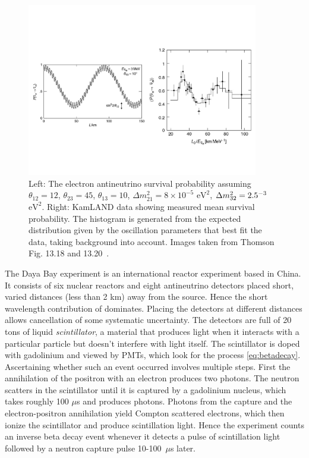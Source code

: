\begin{figure}
  \centering
  \vspace{-20mm}
  \includegraphics[width=0.9\textwidth,keepaspectratio]
                {pictures/t13_18&20.pdf}
  \vspace*{-15mm}
  \caption{Left: The electron antineutrino survival probability assuming
           $\theta_{12}=12$\textdegree, $\theta_{23}=45$\textdegree,
           $\theta_{13}=10$\textdegree, $\Delta m_{21}^2=8\times10^{-5}$
           $\text{eV}^2$, $\Delta m_{32}^2=2.5\time10^{-3}$ $\text{eV}^2$.
           Right: KamLAND data showing measured mean survival probability.
           The histogram is generated from the expected distribution given
           by the oscillation parameters that best fit the data, taking
           background into account. Images taken from Thomson Fig.
           13.18 and 13.20~\cite{thomson_modern_2013}.}
  \label{fig:kamland}
\end{figure}

The Daya Bay experiment is an international reactor experiment based in China.
It consists of
six nuclear reactors and eight antineutrino detectors placed short, varied
distances (less than 2 km) away from the source. Hence the short
wavelength contribution of  dominates. Placing the
detectors at different distances allows cancellation of some systematic
uncertainty. The detectors are full of 20 tons of
liquid {\it scintillator}, a material that produces light when it interacts
with a particular particle but doesn't interfere with light itself.
The scintillator is doped with gadolinium and viewed by PMTs, which look for
the process \eqref{eq:betadecay}. Ascertaining whether such an event occurred
involves multiple steps. First the annihilation of the positron with an
electron produces two photons. The neutron scatters in the scintillator until
it is captured by a gadolinium nucleus, which takes roughly 100 $\mu$s and
produces photons. Photons from
the capture and the electron-positron annihilation yield Compton scattered
electrons, which then ionize the scintillator and produce scintillation light.
Hence the experiment counts an inverse beta decay event whenever it detects
a pulse of scintillation light followed by a neutron capture pulse
10-100~$\mu$s later.

